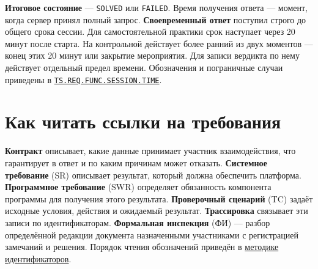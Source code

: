 \documentclass[12pt,a4paper]{article}
\begin{document}
\textbf{Итоговое состояние} --- \texttt{SOLVED} или \texttt{FAILED}. Время получения ответа --- момент, когда сервер принял полный запрос. \textbf{Своевременный ответ} поступил строго до общего срока сессии. Для самостоятельной практики срок наступает через 20 минут после старта. На контрольной действует более ранний из двух моментов --- конец этих 20 минут или закрытие мероприятия. Для записи вердикта по нему действует отдельный предел времени. Обозначения и пограничные случаи приведены в {\href{../../02\_Техническое\_задание/Техническое\_задание.pdf\#ts-req-func-session-time}{\texttt{TS.\allowbreak{}REQ.\allowbreak{}FUNC.\allowbreak{}SESSION.\allowbreak{}TIME}}}.

\section{Как читать ссылки на требования}\label{ux43aux430ux43a-ux447ux438ux442ux430ux442ux44c-ux441ux441ux44bux43bux43aux438-ux43dux430-ux442ux440ux435ux431ux43eux432ux430ux43dux438ux44f}

\hypertarget{как-читать-ссылки-на-требования}{}

\textbf{Контракт} описывает, какие данные принимает участник взаимодействия, что гарантирует в ответ и по каким причинам может отказать. \textbf{Системное требование} (SR) описывает результат, который должна обеспечить платформа. \textbf{Программное требование} (SWR) определяет обязанность компонента программы для получения этого результата. \textbf{Проверочный сценарий} (TC) задаёт исходные условия, действия и ожидаемый результат. \textbf{Трассировка} связывает эти записи по идентификаторам. \textbf{Формальная инспекция} (ФИ) --- разбор определённой редакции документа назначенными участниками с регистрацией замечаний и решения. Порядок чтения обозначений приведён в {\href{Методика\_идентификаторов.pdf\#форматы}{методике идентификаторов}}.
\end{document}

